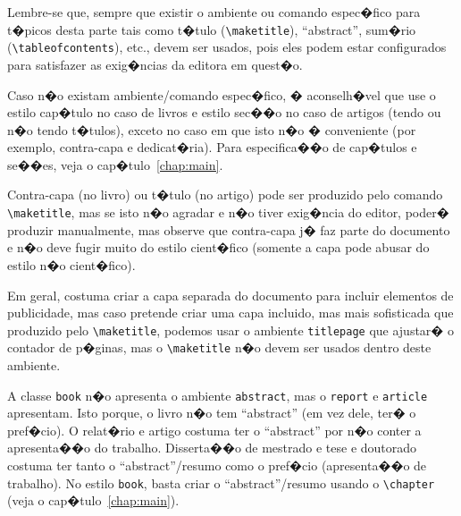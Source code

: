\documentclass[12pt,a4paper,oneside, openany, titlepage]{book}
\begin{document}
Lembre-se que, sempre que existir o ambiente ou comando espec�fico para t�picos
desta parte tais como t�tulo (\verb+\maketitle+), ``abstract'', sum�rio
(\verb+\tableofcontents+), etc., 
devem ser usados, pois eles podem estar configurados para satisfazer
as exig�ncias da editora em quest�o.

Caso n�o existam ambiente/comando espec�fico, � aconselh�vel que use 
o estilo cap�tulo no caso de livros e estilo sec��o no caso de artigos 
(tendo ou n�o tendo t�tulos), exceto no caso em que isto n�o � conveniente
(por exemplo, contra-capa e dedicat�ria).
Para especifica��o de cap�tulos e se��es, veja o cap�tulo~\ref{chap:main}.

Contra-capa (no livro) ou t�tulo (no artigo) pode ser produzido pelo
comando \verb+\maketitle+, mas se isto n�o agradar e n�o tiver exig�ncia 
do editor, poder� produzir manualmente, mas observe que contra-capa 
j� faz parte do documento e n�o deve fugir muito do estilo
cient�fico (somente a capa pode abusar do estilo n�o cient�fico).

Em geral, costuma criar a capa separada do documento para incluir elementos 
de publicidade, mas caso pretende criar uma capa incluido, 
mas mais sofisticada que produzido pelo \verb+\maketitle+, 
podemos usar o ambiente \texttt{titlepage} que ajustar� 
o contador de p�ginas, mas o \verb+\maketitle+ n�o devem ser usados dentro 
deste ambiente.

A classe \texttt{book} n�o apresenta o ambiente \texttt{abstract}, 
mas o \texttt{report} e \texttt{article} apresentam.
Isto porque, o livro n�o tem ``abstract'' (em vez dele, ter� o pref�cio). 
O relat�rio e artigo costuma ter o ``abstract'' por n�o conter a apresenta��o 
do trabalho.
Disserta��o de mestrado e tese e doutorado costuma ter tanto o ``abstract''/resumo como o pref�cio (apresenta��o de trabalho). 
No estilo \texttt{book}, basta criar o ``abstract''/resumo usando 
o \verb+\chapter+ (veja o cap�tulo~\ref{chap:main}).
\end{document}
